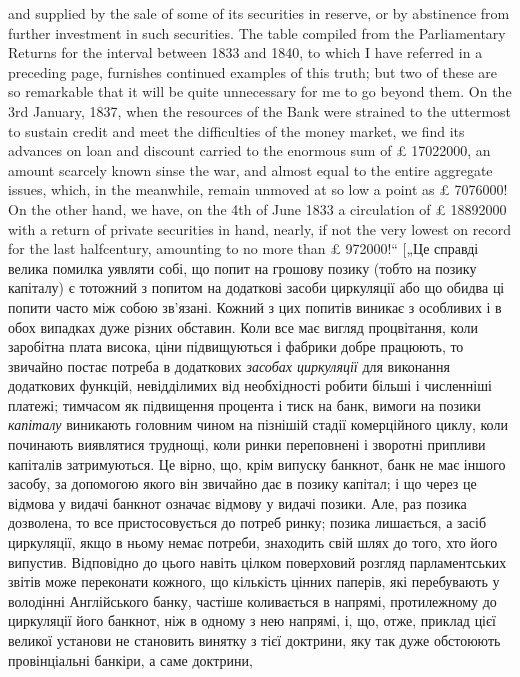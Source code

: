 {and supplied by the sale of some of its securities in reserve, or by abstinence from
further investment in such securities. The table compiled from the Parliamentary
Returns for the interval between 1833 and 1840, to which I have referred in a preceding page,
furnishes continued examples of this truth; but two of these are so
remarkable that it will be quite unnecessary for me to go beyond them. On the
3rd January, 1837, when the resources of the Bank were strained to the uttermost
to sustain credit and meet the difficulties of the money market, we find its advances on loan and
discount carried to the enormous sum of £ 17022000, an
amount scarcely known sinse the war, and almost equal to the entire aggregate
issues, which, in the meanwhile, remain unmoved at so low a point as £ 7076000!
On the other hand, we have, on the 4th of June 1833 a circulation of £ 18892000
with a return of private securities in hand, nearly, if not the very lowest on
record for the last halfcentury, amounting to no more than £ 972000!“ [„Це справді
велика помилка уявляти собі, що попит на грошову позику (тобто на позику
капіталу) є тотожний з попитом на додаткові засоби циркуляції або що обидва
ці попити часто між собою зв’язані. Кожний з цих попитів виникає з особливих і в обох випадках дуже
різних обставин. Коли все має вигляд процвітання, коли заробітна плата висока, ціни підвищуються і
фабрики добре працюють, то звичайно постає потреба в додаткових \emph{засобах циркуляції} для виконання
додаткових функцій, невідділимих від необхідності робити більші і
численніші платежі; тимчасом як підвищення процента і тиск на банк, вимоги
на позики \emph{капіталу} виникають головним чином на пізнішій стадії комерційного циклу, коли починають
виявлятися труднощі, коли ринки переповнені
і зворотні припливи капіталів затримуються. Це вірно, що, крім випуску банкнот,
банк не має іншого засобу, за допомогою якого він звичайно дає в позику
капітал; і що через це відмова у видачі банкнот означає відмову у видачі позики.
Але, раз позика дозволена, то все пристосовується до потреб ринку; позика
лишається, а засіб циркуляції, якщо в ньому немає потреби, знаходить
свій шлях до того, хто його випустив. Відповідно до цього навіть цілком поверховий
розгляд парламентських звітів може переконати кожного, що кількість
цінних паперів, які перебувають у володінні Англійського банку, частіше коливається
в напрямі, протилежному до циркуляції його банкнот, ніж в одному
з нею напрямі, і, що, отже, приклад цієї великої установи не становить винятку
з тієї доктрини, яку так дуже обстоюють провінціальні банкіри, а саме доктрини,
}
